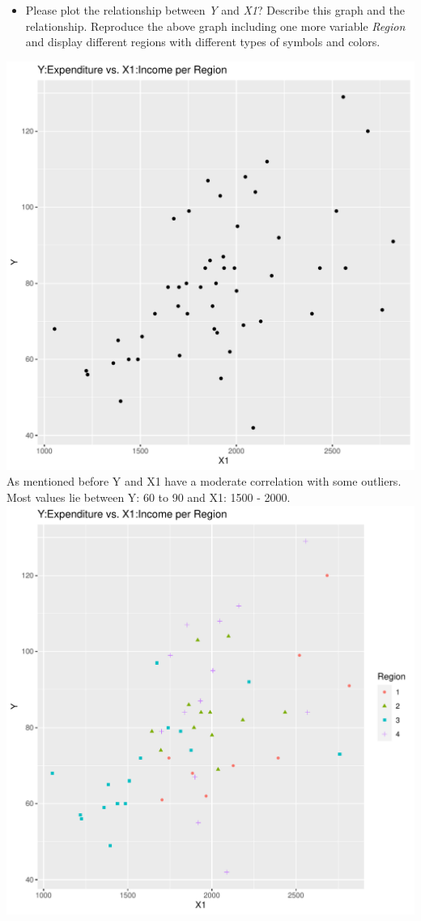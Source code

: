 \documentclass[12pt,letterpaper]{article}
\begin{document}
\begin{enumerate}
\begin{itemize}
 


\item
Please plot the relationship between \emph{Y} and \emph{X1}? Describe this graph and the relationship. Reproduce the above graph including one more variable \emph{Region} and display different regions with different types of symbols and colors.
\end{itemize}
\includegraphics[width=.50\textwidth]{plot4.pdf} \\
As mentioned before Y and X1 have a moderate correlation with some outliers. Most values lie between Y: 60 to 90 and X1: 1500 - 2000.\\

\includegraphics[width=.85\textwidth]{plot5.pdf} \\


\end{enumerate}
\end{document}
